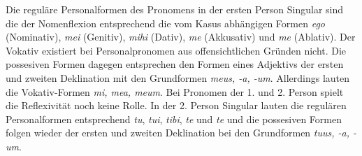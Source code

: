 Die reguläre Personalformen des Pronomens in der ersten Person Singular sind die der Nomenflexion entsprechend die vom Kasus abhängigen Formen \textit{ego} (Nominativ), \textit{mei} (Genitiv), \textit{mihi} (Dativ), \textit{me} (Akkusativ) und \textit{me} (Ablativ). Der Vokativ existiert bei Personalpronomen aus offensichtlichen Gründen nicht. Die possesiven Formen dagegen entsprechen den Formen eines Adjektivs der ersten und zweiten Deklination mit den Grundformen \textit{meus, -a, -um}. Allerdings lauten die Vokativ-Formen \textit{mi, mea, meum}. Bei Pronomen der 1. und 2. Person spielt die Reflexivität noch keine Rolle. In der 2. Person Singular lauten die regulären Personalformen entsprechend \textit{tu}, \textit{tui}, \textit{tibi}, \textit{te} und \textit{te} und die possesiven Formen folgen wieder der ersten und zweiten Deklination bei den Grundformen \textit{tuus, -a, -um}. \par
